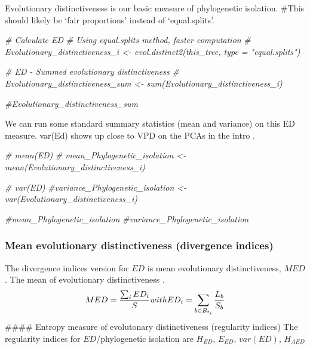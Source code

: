 \documentclass[]{book}
\newenvironment{Shaded}{\begin{snugshade}}{\end{snugshade}}
\newcommand{\CommentTok}[1]{\textcolor[rgb]{0.56,0.35,0.01}{\textit{{#1}}}}
\theoremstyle{definition}
\theoremstyle{definition}
\theoremstyle{remark}
\begin{document}
Evolutionary distinctiveness is our basic measure of phylogenetic
isolation. \#This should likely be `fair proportions' instead of
`equal.splits'.

\begin{Shaded}
\begin{Highlighting}[]
\CommentTok{# Calculate ED}
\CommentTok{# Using equal.splits method, faster computation}
\CommentTok{# Evolutionary_distinctiveness_i <- evol.distinct2(this_tree, type = "equal.splits")  }

\CommentTok{# ED - Summed evolutionary distinctiveness}
\CommentTok{# Evolutionary_distinctiveness_sum <- sum(Evolutionary_distinctiveness_i)}
\end{Highlighting}
\end{Shaded}

\begin{Shaded}
\begin{Highlighting}[]
\CommentTok{#Evolutionary_distinctiveness_sum}
\end{Highlighting}
\end{Shaded}

We can run some standard summary statistics (mean and variance) on this
ED measure. var(Ed) shows up close to VPD on the PCAs in the intro
\citep{Tucker2016}.

\begin{Shaded}
\begin{Highlighting}[]
\CommentTok{# mean(ED)}
\CommentTok{# mean_Phylogenetic_isolation <- mean(Evolutionary_distinctiveness_i)}

\CommentTok{# var(ED)}
\CommentTok{#variance_Phylogenetic_isolation <- var(Evolutionary_distinctiveness_i)}
\end{Highlighting}
\end{Shaded}

\begin{Shaded}
\begin{Highlighting}[]
\CommentTok{#mean_Phylogenetic_isolation}
\CommentTok{#variance_Phylogenetic_isolation}
\end{Highlighting}
\end{Shaded}

\subsubsection{Mean evolutionary distinctiveness (divergence
indices)}\label{mean-evolutionary-distinctiveness-divergence-indices}

The divergence indices version for \(ED\) is mean evolutionary
distinctiveness, \(MED\). The mean of evolutionary distinctiveness
\citep{Redding2003, Isaac2007}. \[
MED = \dfrac
{\sum_{i} ED_{i}}
{S} \\
\ \\
with \\
\ \\
ED_{i} = \sum_{b \in B_{t_{i}}} \dfrac{L_{b}}{S_{b}}
\] \#\#\#\# Entropy measure of evolutonary distinctiveness (regularity
indices) The regularity indices for \(ED\)/phylogenetic isolation are
\(H_{ED}\), \(E_{ED}\), \(var(ED)\), \(H_{AED}\)
\end{document}
